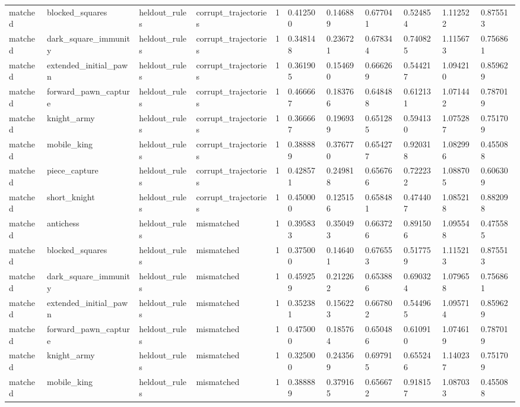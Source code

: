 \begin{tabular}{lllllllllll}
matched & blocked\_squares & heldout\_rules & corrupt\_trajectories & 1 & 0.412500 & 0.146889 & 0.677041 & 0.524854 & 1.112522 & 0.875513 \\
matched & dark\_square\_immunity & heldout\_rules & corrupt\_trajectories & 1 & 0.348148 & 0.236721 & 0.678344 & 0.740825 & 1.115673 & 0.756861 \\
matched & extended\_initial\_pawn & heldout\_rules & corrupt\_trajectories & 1 & 0.361905 & 0.154690 & 0.666269 & 0.544217 & 1.094210 & 0.859629 \\
matched & forward\_pawn\_capture & heldout\_rules & corrupt\_trajectories & 1 & 0.466667 & 0.183766 & 0.648488 & 0.612131 & 1.071442 & 0.787019 \\
matched & knight\_army & heldout\_rules & corrupt\_trajectories & 1 & 0.366667 & 0.196939 & 0.651285 & 0.594130 & 1.075287 & 0.751709 \\
matched & mobile\_king & heldout\_rules & corrupt\_trajectories & 1 & 0.388889 & 0.376770 & 0.654277 & 0.920318 & 1.082996 & 0.455088 \\
matched & piece\_capture & heldout\_rules & corrupt\_trajectories & 1 & 0.428571 & 0.249818 & 0.656766 & 0.722232 & 1.088705 & 0.606309 \\
matched & short\_knight & heldout\_rules & corrupt\_trajectories & 1 & 0.450000 & 0.125156 & 0.658481 & 0.474407 & 1.085218 & 0.882098 \\
matched & antichess & heldout\_rules & mismatched & 1 & 0.395833 & 0.350493 & 0.663726 & 0.891506 & 1.095548 & 0.475585 \\
matched & blocked\_squares & heldout\_rules & mismatched & 1 & 0.375000 & 0.146401 & 0.676553 & 0.517759 & 1.115213 & 0.875513 \\
matched & dark\_square\_immunity & heldout\_rules & mismatched & 1 & 0.459259 & 0.212262 & 0.653886 & 0.690324 & 1.079658 & 0.756861 \\
matched & extended\_initial\_pawn & heldout\_rules & mismatched & 1 & 0.352381 & 0.156223 & 0.667802 & 0.544965 & 1.095714 & 0.859629 \\
matched & forward\_pawn\_capture & heldout\_rules & mismatched & 1 & 0.475000 & 0.185764 & 0.650486 & 0.610910 & 1.074619 & 0.787019 \\
matched & knight\_army & heldout\_rules & mismatched & 1 & 0.325000 & 0.243569 & 0.697915 & 0.655246 & 1.140237 & 0.751709 \\
matched & mobile\_king & heldout\_rules & mismatched & 1 & 0.388889 & 0.379165 & 0.656672 & 0.918157 & 1.087033 & 0.455088 \\

\end{tabular}

